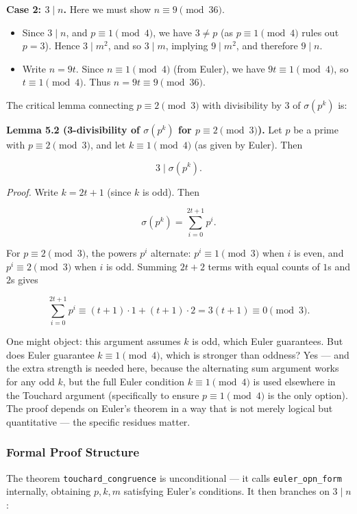 \documentclass[11pt,a4paper]{article}
\begin{document}
\textbf{Case 2: $3 \mid n$.} Here we must show $n \equiv 9 \pmod{36}$.

\begin{itemize}
    \item Since $3 \mid n$, and $p \equiv 1 \pmod{4}$, we have $3 \neq p$ (as $p \equiv 1 \pmod{4}$ rules out $p = 3$). Hence $3 \mid m^2$, and so $3 \mid m$, implying $9 \mid m^2$, and therefore $9 \mid n$.
    \item Write $n = 9t$. Since $n \equiv 1 \pmod{4}$ (from Euler), we have $9t \equiv 1 \pmod{4}$, so $t \equiv 1 \pmod{4}$. Thus $n = 9t \equiv 9 \pmod{36}$.
\end{itemize}

The critical lemma connecting $p \equiv 2 \pmod{3}$ with divisibility by $3$ of $\sigma(p^k)$ is:

\textbf{Lemma 5.2 (3-divisibility of $\sigma(p^k)$ for $p \equiv 2 \pmod{3}$).} Let $p$ be a prime with $p \equiv 2 \pmod{3}$, and let $k \equiv 1 \pmod{4}$ (as given by Euler). Then

\[3 \mid \sigma(p^k).\]

\emph{Proof.} Write $k = 2t + 1$ (since $k$ is odd). Then

\[\sigma(p^k) = \sum_{i=0}^{2t+1} p^i.\]

For $p \equiv 2 \pmod{3}$, the powers $p^i$ alternate: $p^i \equiv 1 \pmod{3}$ when $i$ is even, and $p^i \equiv 2 \pmod{3}$ when $i$ is odd. Summing $2t+2$ terms with equal counts of $1$s and $2$s gives

\[\sum_{i=0}^{2t+1} p^i \equiv (t+1) \cdot 1 + (t+1) \cdot 2 = 3(t+1) \equiv 0 \pmod{3}.\]

One might object: this argument assumes $k$ is odd, which Euler guarantees. But does Euler guarantee $k \equiv 1 \pmod{4}$, which is stronger than oddness? Yes --- and the extra strength is needed here, because the alternating sum argument works for any odd $k$, but the full Euler condition $k \equiv 1 \pmod{4}$ is used elsewhere in the Touchard argument (specifically to ensure $p \equiv 1 \pmod{4}$ is the only option). The proof depends on Euler's theorem in a way that is not merely logical but quantitative --- the specific residues matter.

\subsubsection{Formal Proof Structure}

The theorem \texttt{touchard\_congruence} is unconditional --- it calls \texttt{euler\_opn\_form} internally, obtaining $p, k, m$ satisfying Euler's conditions. It then branches on $3 \mid n$:
\end{document}
